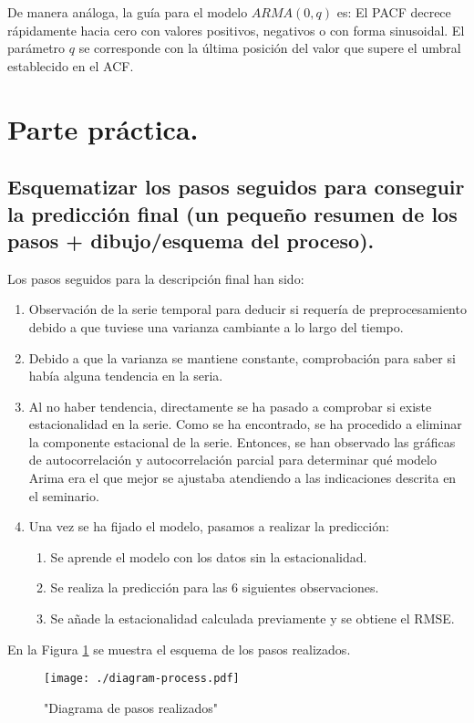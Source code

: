 \documentclass[11pt]{article}
\begin{document}
 De manera análoga, la guía para el modelo \(ARMA(0,q)\) es: El PACF
decrece rápidamente hacia cero con valores positivos, negativos o con
forma sinusoidal. El parámetro \(q\) se corresponde con la última
posición del valor que supere el umbral establecido en el ACF.


\section{Parte práctica.}
\label{sec:orge79cfdc}
\subsection{Esquematizar los pasos seguidos para conseguir la predicción final (un pequeño resumen de los pasos + dibujo/esquema del proceso).}
\label{sec:orgdadb203}


Los pasos seguidos para la descripción final han sido:
\begin{enumerate}
\item Observación de la serie temporal para deducir si requería de
preprocesamiento debido a que tuviese una varianza cambiante a lo
largo del tiempo.
\item Debido a que la varianza se mantiene constante, comprobación para
saber si había alguna tendencia en la seria.
\item Al no haber tendencia, directamente se ha pasado a comprobar si
existe estacionalidad en la serie. Como se ha encontrado, se
ha procedido a eliminar la componente estacional de la
serie. Entonces, se han observado las gráficas de autocorrelación y
autocorrelación parcial para determinar qué modelo Arima era el que
mejor se ajustaba atendiendo a las indicaciones descrita en el seminario.
\item Una vez se ha fijado el modelo, pasamos a realizar la predicción:
\begin{enumerate}
\item Se aprende el modelo con los datos sin la estacionalidad.
\item Se realiza la predicción para las 6 siguientes observaciones.
\item Se añade la estacionalidad calculada previamente y se obtiene el RMSE.
\end{enumerate}
\end{enumerate}

En la Figura \ref{fig:org1ac4e00} se muestra el esquema de los pasos
realizados. 

\begin{figure}[htbp]
\centering
\texttt{[image: ./diagram-process.pdf]}
\caption{\label{fig:org1ac4e00}
"Diagrama de pasos realizados"}
\end{figure}
\end{document}

